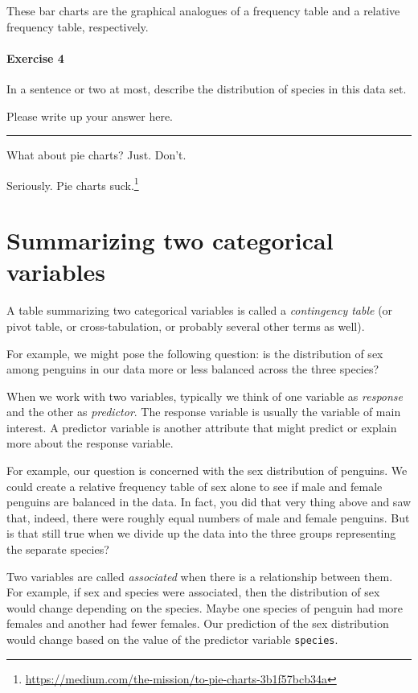 \documentclass[
]{book}
\begin{document}
These bar charts are the graphical analogues of a frequency table and a relative frequency table, respectively.

\hypertarget{exercise-4}{%
\paragraph*{Exercise 4}\label{exercise-4}}

In a sentence or two at most, describe the distribution of species in this data set.

Please write up your answer here.

\begin{center}\rule{0.5\linewidth}{0.5pt}\end{center}

What about pie charts? Just. Don't.

Seriously. Pie charts suck.\footnote{\url{https://medium.com/the-mission/to-pie-charts-3b1f57bcb34a}}

\hypertarget{categorical-summarizing-two}{%
\section{Summarizing two categorical variables}\label{categorical-summarizing-two}}

A table summarizing two categorical variables is called a \emph{contingency table} (or pivot table, or cross-tabulation, or probably several other terms as well).

For example, we might pose the following question: is the distribution of sex among penguins in our data more or less balanced across the three species?

When we work with two variables, typically we think of one variable as \emph{response} and the other as \emph{predictor}. The response variable is usually the variable of main interest. A predictor variable is another attribute that might predict or explain more about the response variable.

For example, our question is concerned with the sex distribution of penguins. We could create a relative frequency table of sex alone to see if male and female penguins are balanced in the data. In fact, you did that very thing above and saw that, indeed, there were roughly equal numbers of male and female penguins. But is that still true when we divide up the data into the three groups representing the separate species?

Two variables are called \emph{associated} when there is a relationship between them. For example, if sex and species were associated, then the distribution of sex would change depending on the species. Maybe one species of penguin had more females and another had fewer females. Our prediction of the sex distribution would change based on the value of the predictor variable \texttt{species}.
\end{document}
